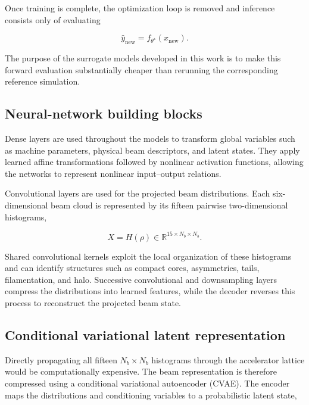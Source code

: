 Once training is complete, the optimization loop is removed and inference consists only of evaluating

\begin{equation}
\label{eq:57}
\widehat y_{\mathrm{new}}=f_{\theta^{\star}}(x_{\mathrm{new}}).
\end{equation}

The purpose of the surrogate models developed in this work is to make this forward evaluation substantially cheaper than rerunning the corresponding reference simulation.

\subsection{Neural-network building blocks}
\label{sec:04_machine_learning_methodology_neural_network_building_blocks}

Dense layers are used throughout the models to transform global variables such as machine parameters, physical beam descriptors, and latent states. They apply learned affine transformations followed by nonlinear activation functions, allowing the networks to represent nonlinear input–output relations.

Convolutional layers are used for the projected beam distributions. Each six-dimensional beam cloud is represented by its fifteen pairwise two-dimensional histograms,

\begin{equation}
\label{eq:58}
X=H(\rho)\in\mathbb R^{15\times N_b\times N_b}.
\end{equation}

Shared convolutional kernels exploit the local organization of these histograms and can identify structures such as compact cores, asymmetries, tails, filamentation, and halo. Successive convolutional and downsampling layers compress the distributions into learned features, while the decoder reverses this process to reconstruct the projected beam state.

\subsection{Conditional variational latent representation}
\label{sec:04_machine_learning_methodology_conditional_variational_latent_representation}

Directly propagating all fifteen \(N_{b} \times N_{b}\) histograms through the accelerator lattice would be computationally expensive. The beam representation is therefore compressed using a conditional variational autoencoder (CVAE). The encoder maps the distributions and conditioning variables to a probabilistic latent state,


